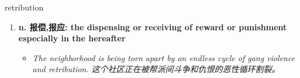 
\begin{frame}
{\huge retribution}
\begin{center}
\begin{enumerate}\Large
  \item \textbf{n. 报偿,报应: the dispensing or receiving of reward or punishment especially in the hereafter}
  \begin{itemize}
    \item \em{\Large{The neighborhood is being torn apart by an endless cycle of gang violence and retribution. 这个社区正在被帮派间斗争和仇恨的恶性循环割裂。}}
  \end{itemize}
\end{enumerate}
\end{center}
\end{frame}
